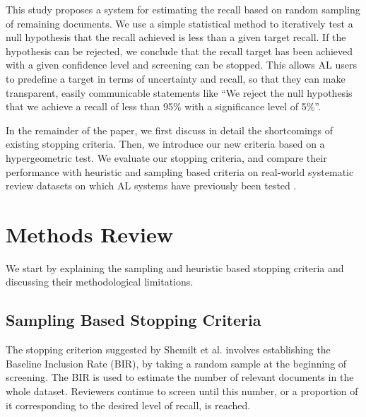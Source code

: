 \documentclass{bmcart}
\begin{document}
	This study proposes a system for estimating the recall based on random sampling of remaining documents. 
	We use a simple statistical method to iteratively test a null hypothesis that the recall achieved is less than a given target recall. If the hypothesis can be rejected, we conclude that the recall target has been achieved with a given confidence level and screening can be stopped.
	This allows AL users to predefine a target in terms of uncertainty and recall, so that they can make transparent, easily communicable statements like ``We reject the null hypothesis that we achieve a recall of less than 95\% with a significance level of 5\%''.
	
	
	
	In the remainder of the paper, we first discuss in detail the shortcomings of existing stopping criteria. Then, we introduce our new criteria based on a hypergeometric test. We evaluate our stopping criteria, and compare their performance with heuristic and sampling based criteria on real-world systematic review datasets on which AL systems have previously been tested \cite{Cohen2006, Yu2019, Terasawa2009, Castaldi2009}.
	
	\section*{Methods Review}
	
	
	We start by explaining the sampling and heuristic based stopping criteria and discussing their methodological limitations. 
	
	\subsection*{Sampling Based Stopping Criteria}
	
	The stopping criterion suggested by Shemilt et al. \cite{Shemilt2014} involves establishing the Baseline Inclusion Rate (BIR), by taking a random sample at the beginning of screening. 
	The BIR is used to estimate the number of relevant documents in the whole dataset. 
	Reviewers continue to screen until this number, or a proportion of it corresponding to the desired level of recall, is reached.
	
\end{document}
